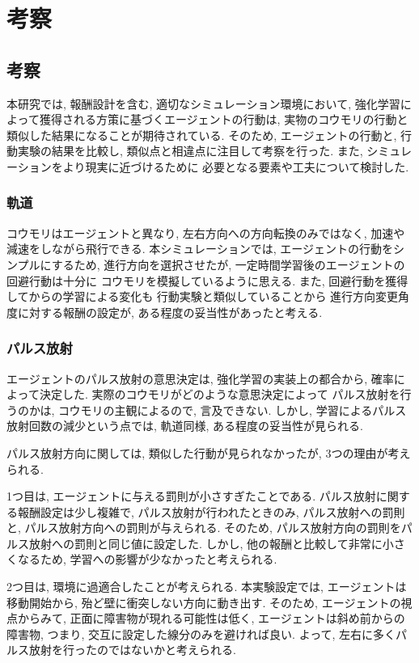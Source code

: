\documentclass[../main]{subfiles}
\begin{document}
\newpage
\chapter{考察}
\label{chap:result}

\section{考察}
本研究では, 報酬設計を含む, 適切なシミュレーション環境において, 
強化学習によって獲得される方策に基づくエージェントの行動は, 
実物のコウモリの行動と類似した結果になることが期待されている.
そのため, エージェントの行動と, 行動実験の結果を比較し, 
類似点と相違点に注目して考察を行った. 
また, シミュレーションをより現実に近づけるために
必要となる要素や工夫について検討した.


\subsection{軌道}
コウモリはエージェントと異なり, 
左右方向への方向転換のみではなく, 
加速や減速をしながら飛行できる.
本シミュレーションでは, エージェントの行動をシンプルにするため, 
進行方向を選択させたが, 
一定時間学習後のエージェントの回避行動は十分に
コウモリを模擬しているように思える.
また, 回避行動を獲得してからの学習による変化も
行動実験と類似していることから
進行方向変更角度に対する報酬の設定が,
ある程度の妥当性があったと考える.


\subsection{パルス放射}
エージェントのパルス放射の意思決定は, 
強化学習の実装上の都合から, 
確率によって決定した.
実際のコウモリがどのような意思決定によって 
パルス放射を行うのかは, 
コウモリの主観によるので, 言及できない.
しかし, 学習によるパルス放射回数の減少という点では, 
軌道同様, ある程度の妥当性が見られる.

パルス放射方向に関しては, 
類似した行動が見られなかったが, 
3つの理由が考えられる.

1つ目は, エージェントに与える罰則が小さすぎたことである.
パルス放射に関する報酬設定は少し複雑で, 
パルス放射が行われたときのみ, 
パルス放射への罰則と, パルス放射方向への罰則が与えられる.
そのため, パルス放射方向の罰則をパルス放射への罰則と同じ値に設定した.
しかし, 他の報酬と比較して非常に小さくなるため, 
学習への影響が少なかったと考えられる.

2つ目は, 環境に過適合したことが考えられる.
本実験設定では, エージェントは移動開始から, 
殆ど壁に衝突しない方向に動き出す.
そのため, エージェントの視点からみて, 
正面に障害物が現れる可能性は低く, 
エージェントは斜め前からの障害物, つまり, 
交互に設定した線分のみを避ければ良い.
よって, 左右に多くパルス放射を行ったのではないかと考えられる.
\end{document}
